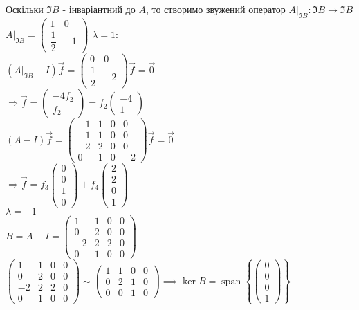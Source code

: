 \documentclass[a4paper, 10pt]{article}
\theoremstyle{theoremdd}
\DeclareMathOperator{\linspan}{span}
\begin{document}
Оскільки $\Im B$ - інваріантний до $A$, то створимо звужений оператор $A|_{\Im B}: \Im B \to \Im B$\\
$A|_{\Im B} = \begin{pmatrix}
1 & 0 \\
\dfrac{1}{2} & -1
\end{pmatrix}$
$\lambda = 1:$\\
$(A|_{\Im B} - I)\vec{f} = \begin{pmatrix}
0 & 0 \\
\dfrac{1}{2} & -2
\end{pmatrix} \vec{f} = \vec{0}$\\
$\Rightarrow \vec{f} = \begin{pmatrix}
-4f_2 \\ f_2
\end{pmatrix} = f_2 \begin{pmatrix}
-4 \\ 1
\end{pmatrix}$\\
$(A-I)\vec{f} = \begin{pmatrix}
-1 & 1 & 0 & 0 \\
-1 & 1 & 0 & 0 \\
-2 & 2 & 0 & 0 \\
0 & 1 & 0 & -2
\end{pmatrix} \vec{f} = \vec{0}$\\
$\Rightarrow \vec{f} = f_3 \begin{pmatrix}
0 \\ 0 \\ 1 \\ 0
\end{pmatrix} + f_4 \begin{pmatrix}
2 \\ 2 \\ 0 \\ 1
\end{pmatrix}$
\bigskip \\
$\lambda = -1$\\
$B = A+I = \begin{pmatrix}
1 & 1 & 0 & 0 \\
0 & 2 & 0 & 0 \\
-2 & 2 & 2 & 0 \\
0 & 1 & 0 & 0
\end{pmatrix}$\\
$\begin{pmatrix}
1 & 1 & 0 & 0 \\
0 & 2 & 0 & 0 \\
-2 & 2 & 2 & 0 \\
0 & 1 & 0 & 0
\end{pmatrix} \sim \begin{pmatrix}
1 & 1 & 0 & 0 \\
0 & 2 & 1 & 0 \\
0 & 0 & 1 & 0
\end{pmatrix} \implies \ker B = \linspan \left\{ \begin{pmatrix}
0 \\ 0 \\ 0 \\ 1
\end{pmatrix} \right\}$
\end{document}
